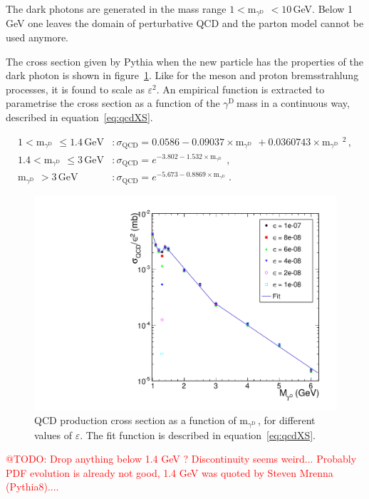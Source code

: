 \documentclass[12pt,a4paper]{article}
\newcommand{\mathDP}{\gamma^{\mathrm{D}}\ }
\newcommand{\mathmDP}{\mathrm{m}_{\mathDP}\ }
\newcommand{\DP}{$\mathDP$}
\newcommand{\mDP}{m$_{\mathDP}$}
\begin{document}
The dark photons are generated in the mass range $1 < \mathmDP <
10$\,GeV. Below 1\,GeV one leaves the domain of perturbative QCD and
the parton model cannot be used anymore.

The cross section given by Pythia when the new particle has the
properties of the dark photon is shown in figure~\ref{fig:qcdXS}. Like
for the meson and proton bremsstrahlung processes, it is found to
scale as $\varepsilon^2$. An empirical function is extracted to
parametrise the cross section as a function of the \DP mass in a
continuous way, described in equation~\ref{eq:qcdXS}.

\begin{align}
  1 < \mathmDP \leq 1.4\,\mathrm{GeV} & : \sigma_{\mathrm{QCD}} =  0.0586-0.09037\times \mathmDP + 0.0360743\times \mathmDP^2\,, \label{eq:qcdXS} \\
  1.4 < \mathmDP \leq 3\,\mathrm{GeV} & : \sigma_{\mathrm{QCD}} =  e^{-3.802-1.532\times \mathmDP}\,, \nonumber \\
  \mathmDP > 3\,\mathrm{GeV} & : \sigma_{\mathrm{QCD}} =  e^{-5.673-0.8869\times \mathmDP}. \nonumber
\end{align}


\begin{figure}[h!]
  \centering
\includegraphics[width=1.\textwidth]{figures/qcdXSnorm_massFit.pdf}
\caption{QCD production cross section as a function of \mDP, for
  different values of $\varepsilon$. The fit function is described in
  equation~\ref{eq:qcdXS}.}
\label{fig:qcdXS}
\end{figure}

\textcolor{red}{@TODO: Drop anything below 1.4 GeV ? Discontinuity seems weird... Probably PDF evolution is already not good, 1.4 GeV was quoted by Steven Mrenna (Pythia8)....}
\end{document}
